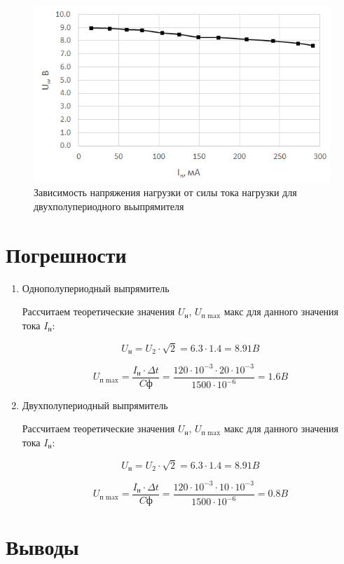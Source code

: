 \begin{figure}[H]
	\begin{center}
		\includegraphics[width=15cm]{img/5}
		\caption{Зависимость напряжения нагрузки от силы тока нагрузки для двухполупериодного вьыпрямителя}
		\label{g:5} %
	\end{center}
\end{figure}

\section{Погрешности}

\begin{enumerate}
\item Однополупериодный выпрямитель

Рассчитаем теоретические значения $U_\text{н}$, $U_\text{п max}$ макс для данного значения тока $I_\text{н}$:

\begin{equation}
U_\text{н} = U_2 \cdot \sqrt{2} = 6.3 \cdot 1.4 = 8.91 B
\end{equation}

\begin{equation}
U_\text{п max} = \frac{I_\text{н} \cdot \Delta t}{C\text{ф}} = \frac{120 \cdot 10^{-3}\cdot 20 \cdot 10^{-3}}{1500 \cdot 10^{-6}} = 1.6 B
\end{equation}

\item Двухполупериодный выпрямитель

Рассчитаем теоретические значения $U_\text{н}$, $U_\text{п max}$ макс для данного значения тока $I_\text{н}$:

\begin{equation}
U_\text{н} = U_2 \cdot \sqrt{2} = 6.3 \cdot 1.4 = 8.91 B
\end{equation}

\begin{equation}
U_\text{п max} = \frac{I_\text{н} \cdot \Delta t}{C\text{ф}} = \frac{120 \cdot 10^{-3}\cdot 10 \cdot 10^{-3}}{1500 \cdot 10^{-6}} = 0.8 B
\end{equation}
\end{enumerate}

\vspace{-1cm}
\section{Выводы}




